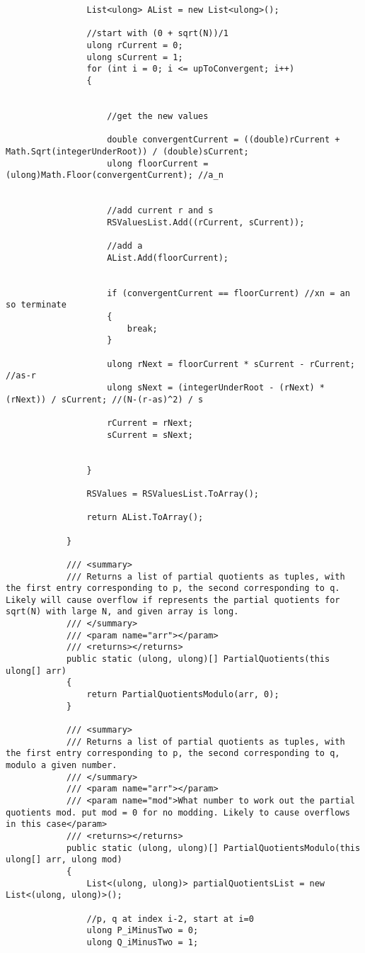 \documentclass{article}
\begin{document}
\begin{lstlisting}
				List<ulong> AList = new List<ulong>();
				
				//start with (0 + sqrt(N))/1
				ulong rCurrent = 0;
				ulong sCurrent = 1;
				for (int i = 0; i <= upToConvergent; i++)
				{
					
					
					//get the new values
					
					double convergentCurrent = ((double)rCurrent + Math.Sqrt(integerUnderRoot)) / (double)sCurrent;
					ulong floorCurrent = (ulong)Math.Floor(convergentCurrent); //a_n
					
					
					//add current r and s
					RSValuesList.Add((rCurrent, sCurrent));
					
					//add a
					AList.Add(floorCurrent);
					
					
					if (convergentCurrent == floorCurrent) //xn = an so terminate
					{
						break;
					}
					
					ulong rNext = floorCurrent * sCurrent - rCurrent; //as-r
					ulong sNext = (integerUnderRoot - (rNext) * (rNext)) / sCurrent; //(N-(r-as)^2) / s
					
					rCurrent = rNext;
					sCurrent = sNext;
					
					
				}
				
				RSValues = RSValuesList.ToArray();
				
				return AList.ToArray();
				
			}
			
			/// <summary>
			/// Returns a list of partial quotients as tuples, with the first entry corresponding to p, the second corresponding to q. Likely will cause overflow if represents the partial quotients for sqrt(N) with large N, and given array is long.
			/// </summary>
			/// <param name="arr"></param>
			/// <returns></returns>
			public static (ulong, ulong)[] PartialQuotients(this ulong[] arr)
			{
				return PartialQuotientsModulo(arr, 0);
			}
			
			/// <summary>
			/// Returns a list of partial quotients as tuples, with the first entry corresponding to p, the second corresponding to q, modulo a given number.
			/// </summary>
			/// <param name="arr"></param>
			/// <param name="mod">What number to work out the partial quotients mod. put mod = 0 for no modding. Likely to cause overflows in this case</param>
			/// <returns></returns>
			public static (ulong, ulong)[] PartialQuotientsModulo(this ulong[] arr, ulong mod)
			{
				List<(ulong, ulong)> partialQuotientsList = new List<(ulong, ulong)>();
				
				//p, q at index i-2, start at i=0
				ulong P_iMinusTwo = 0;
				ulong Q_iMinusTwo = 1;
				

\end{lstlisting}
\end{document}

